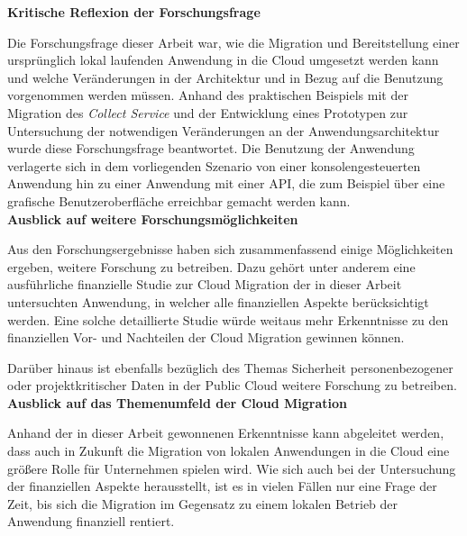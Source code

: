 \textbf{Kritische Reflexion der Forschungsfrage}

Die Forschungsfrage dieser Arbeit war, wie die Migration und Bereitstellung einer ursprünglich lokal laufenden Anwendung in die Cloud umgesetzt werden kann und welche Veränderungen in der Architektur und in Bezug auf die Benutzung vorgenommen werden müssen. Anhand des praktischen Beispiels mit der Migration des \textit{Collect Service} und der Entwicklung eines Prototypen zur Untersuchung der notwendigen Veränderungen an der Anwendungsarchitektur wurde diese Forschungsfrage beantwortet. Die Benutzung der Anwendung verlagerte sich in dem vorliegenden Szenario von einer konsolengesteuerten Anwendung hin zu einer Anwendung mit einer \ac{API}, die zum Beispiel über eine grafische Benutzeroberfläche erreichbar gemacht werden kann. \\

\textbf{Ausblick auf weitere Forschungsmöglichkeiten}

Aus den Forschungsergebnisse haben sich zusammenfassend einige Möglichkeiten ergeben, weitere Forschung zu betreiben. Dazu gehört unter anderem eine ausführliche finanzielle Studie zur Cloud Migration der in dieser Arbeit untersuchten Anwendung, in welcher alle finanziellen Aspekte berücksichtigt werden. Eine solche detaillierte Studie würde weitaus mehr Erkenntnisse zu den finanziellen Vor- und Nachteilen der Cloud Migration gewinnen können.

Darüber hinaus ist ebenfalls bezüglich des Themas Sicherheit personenbezogener oder projektkritischer Daten in der Public Cloud weitere Forschung zu betreiben. \\

\textbf{Ausblick auf das Themenumfeld der Cloud Migration}

Anhand der in dieser Arbeit gewonnenen Erkenntnisse kann abgeleitet werden, dass auch in Zukunft die Migration von lokalen Anwendungen in die Cloud eine größere Rolle für Unternehmen spielen wird. Wie sich auch bei der Untersuchung der finanziellen Aspekte herausstellt, ist es in vielen Fällen nur eine Frage der Zeit, bis sich die Migration im Gegensatz zu einem lokalen Betrieb der Anwendung finanziell rentiert.